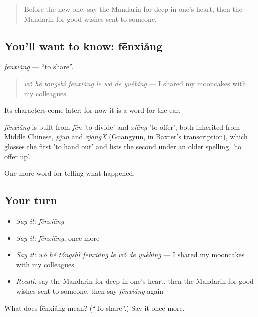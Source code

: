 \label{lesson:ZH-C343-fenxiang}



\begin{quote}
Before the new one: say the Mandarin for deep in one's heart, then the Mandarin for good wishes sent to someone.
\end{quote}

\subsection*{You'll want to know: fēnxiǎng}
\emph{fēnxiǎng} — \textquotedblleft{}to share\textquotedblright{}.

\begin{quote}
\emph{wǒ hé tóngshì fēnxiǎng le wǒ de yuèbǐng} — I shared my mooncakes with my colleagues.
\end{quote}

Its characters come later; for now it is a word for the ear.

\begin{cousinweb}
\emph{fēnxiǎng} is built from \emph{fēn} 'to divide' and \emph{xiǎng} 'to offer', both inherited from Middle Chinese, \emph{pjun} and \emph{xjangX} (Guangyun, in Baxter's transcription), which glosses the first 'to hand out' and lists the second under an older spelling, 'to offer up'.
\end{cousinweb}

\begin{grammarlens}[title={What you've built}]
One more word for telling what happened.
\end{grammarlens}

\subsection*{Your turn}
\begin{itemize}
\raggedright
  \item \emph{Say it:} \emph{fēnxiǎng}
  \item \emph{Say it:} \emph{fēnxiǎng}, once more
  \item \emph{Say it:} \emph{wǒ hé tóngshì fēnxiǎng le wǒ de yuèbǐng} — I shared my mooncakes with my colleagues.
  \item \emph{Recall:} say the Mandarin for deep in one's heart, then the Mandarin for good wishes sent to someone, then say \emph{fēnxiǎng} again
\end{itemize}

\begin{tcolorbox}[breakable,colback=teal!4,colframe=teal!35!black,title={Before you move on}]
What does fēnxiǎng mean? (\textquotedblleft{}To share\textquotedblright{}.) Say it once more.
\end{tcolorbox}
